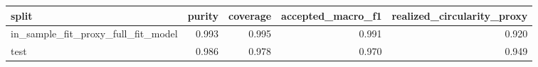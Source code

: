 \begin{tabular}{lrrrr}
\toprule
split & purity & coverage & accepted_macro_f1 & realized_circularity_proxy \\
\midrule
in_sample_fit_proxy_full_fit_model & 0.993 & 0.995 & 0.991 & 0.920 \\
test & 0.986 & 0.978 & 0.970 & 0.949 \\
\bottomrule
\end{tabular}
